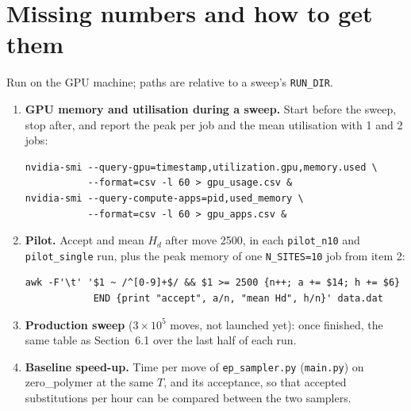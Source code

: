 \documentclass[11pt,a4paper]{article}
\newcommand{\Hd}{H_d}
\newcommand{\file}[1]{\texttt{#1}}
\begin{document}
\section{Missing numbers and how to get them}\label{sec:missing}
Run on the GPU machine; paths are relative to a sweep's \texttt{RUN\_DIR}.
\begin{enumerate}
  \item \textbf{GPU memory and utilisation during a sweep.} Start before the
        sweep, stop after, and report the peak per job and the mean
        utilisation with 1 and 2 jobs:
\begin{verbatim}
nvidia-smi --query-gpu=timestamp,utilization.gpu,memory.used \
           --format=csv -l 60 > gpu_usage.csv &
nvidia-smi --query-compute-apps=pid,used_memory \
           --format=csv -l 60 > gpu_apps.csv &
\end{verbatim}
  \item \textbf{Pilot.} Accept and mean $\Hd$ after move 2500, in each
        \file{pilot\_n10} and \file{pilot\_single} run, plus the peak memory of
        one \texttt{N\_SITES=10} job from item 2:
\begin{verbatim}
awk -F'\t' '$1 ~ /^[0-9]+$/ && $1 >= 2500 {n++; a += $14; h += $6}
            END {print "accept", a/n, "mean Hd", h/n}' data.dat
\end{verbatim}
  \item \textbf{Production sweep} ($3\times10^5$ moves, not launched yet):
        once finished, the same table as Section~6.1 over the last half of
        each run.
  \item \textbf{Baseline speed-up.} Time per move of \file{ep\_sampler.py}
        (\file{main.py}) on zero\_polymer at the same $T$, and its acceptance,
        so that accepted substitutions per hour can be compared between the two
        samplers.
\end{enumerate}

\end{document}
